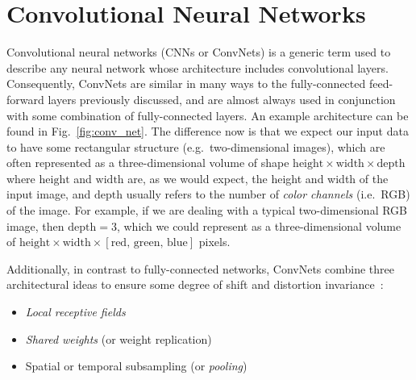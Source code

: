 \documentclass[../main.tex]{subfiles}
\begin{document}
\section{Convolutional Neural Networks}%
\label{sec:conv_nets}
Convolutional neural networks (CNNs or ConvNets) is a generic term used to
describe any neural network whose architecture includes convolutional layers. 
%
Consequently, ConvNets are similar in many ways to the fully-connected
feed-forward layers previously discussed, and are almost always used in
conjunction with some combination of fully-connected layers.
%
An example architecture can be found in Fig.~\ref{fig:conv_net}.
%
The difference now is that we expect our input data to have some rectangular
structure (e.g.\ two-dimensional images), which are often represented as a
three-dimensional volume of shape
$\mathrm{height}\times\mathrm{width}\times\mathrm{depth}$ where
$\mathrm{height}$ and $\mathrm{width}$ are, as we would expect, the height and
width of the input image, and $\mathrm{depth}$ usually refers to the number of
\emph{color channels} (i.e.\ RGB) of the image.
%
For example, if we are dealing with a typical two-dimensional RGB image, then
$\mathrm{depth} = 3$, which we could represent as a three-dimensional volume of
$\mathrm{height}\times\mathrm{width}\times[\mathrm{red}, \,\mathrm{green},\,
\mathrm{blue}]$ pixels.

Additionally, in contrast to fully-connected networks, ConvNets combine three
architectural ideas to ensure some degree of shift and distortion
invariance~\cite{lecun1995convolutional}:
%
\begin{itemize}
  \item \emph{Local receptive fields}
  \item \emph{Shared weights} (or weight replication)
  \item Spatial or temporal subsampling (or \emph{pooling})
\end{itemize}
%
\end{document}
